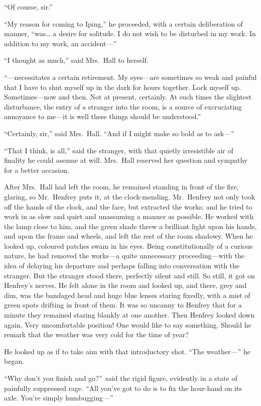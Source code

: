 “Of course, sir.”

“My reason for coming to Iping,” he proceeded, with a certain deliberation of manner, “was… a desire for solitude. I do not wish to be disturbed in my work. In addition to my work, an accident—”

“I thought as much,” said Mrs.\ Hall to herself.

“—necessitates a certain retirement. My eyes—are sometimes so weak and painful that I have to shut myself up in the dark for hours together. Lock myself up. Sometimes—now and then. Not at present, certainly. At such times the slightest disturbance, the entry of a stranger into the room, is a source of excruciating annoyance to me—it is well these things should be understood.”

“Certainly, sir,” said Mrs.\ Hall. “And if I might make so bold as to ask—”

“That I think, is all,” said the stranger, with that quietly irresistible air of finality he could assume at will. Mrs.\ Hall reserved her question and sympathy for a better occasion.

After Mrs.\ Hall had left the room, he remained standing in front of the fire, glaring, so Mr.\ Henfrey puts it, at the clock-mending. Mr.\ Henfrey not only took off the hands of the clock, and the face, but extracted the works; and he tried to work in as slow and quiet and unassuming a manner as possible. He worked with the lamp close to him, and the green shade threw a brilliant light upon his hands, and upon the frame and wheels, and left the rest of the room shadowy. When he looked up, coloured patches swam in his eyes. Being constitutionally of a curious nature, he had removed the works—a quite unnecessary proceeding—with the idea of delaying his departure and perhaps falling into conversation with the stranger. But the stranger stood there, perfectly silent and still. So still, it got on Henfrey’s nerves. He felt alone in the room and looked up, and there, grey and dim, was the bandaged head and huge blue lenses staring fixedly, with a mist of green spots drifting in front of them. It was so uncanny to Henfrey that for a minute they remained staring blankly at one another. Then Henfrey looked down again. Very uncomfortable position! One would like to say something. Should he remark that the weather was very cold for the time of year?

He looked up as if to take aim with that introductory shot. “The weather—” he began.

“Why don’t you finish and go?”\ said the rigid figure, evidently in a state of painfully suppressed rage. “All you’ve got to do is to fix the hour-hand on its axle. You’re simply humbugging—”

